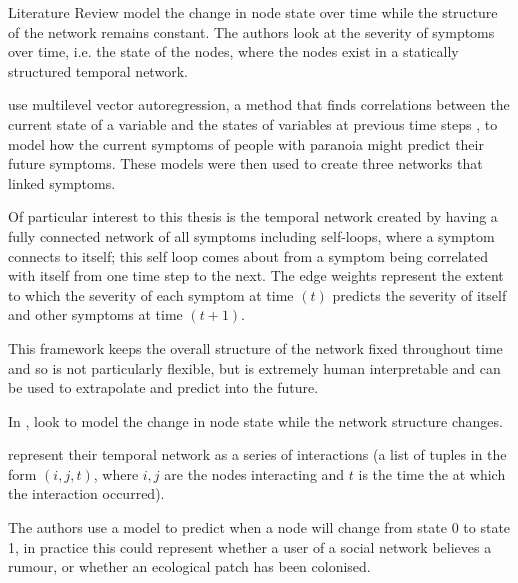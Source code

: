 \documentclass[12pt]{amsbook}
\begin{document}
\begin{chapter}{Literature Review}
        \cite{contreras2020temporal} model the change in node state over time while the structure of the network remains constant. The authors look at the severity of symptoms over time, i.e. the state of the nodes, where the nodes exist in a statically structured temporal network. 
        
         use multilevel vector autoregression, a method that finds correlations between the current state of a variable and the states of variables at previous time steps \cite{singer2003applied}, to model how the current symptoms of people with paranoia might predict their future symptoms. These models were then used to create three networks that linked symptoms. 
        
        Of particular interest to this thesis is the temporal network created by having a fully connected network of all symptoms including self-loops, where a symptom connects to itself; this self loop comes about from a symptom being correlated with itself from one time step to the next. The edge weights represent the extent to which the severity of each symptom at time $(t)$ predicts the severity of itself and other symptoms at time $(t+1)$. 
        
        This framework keeps the overall structure of the network fixed throughout time and so is not particularly flexible, but is extremely human interpretable and can be used to extrapolate and predict into the future. 

        In \cite{KARIMI20133476},  look to model the change in node state while the network structure changes. 
        
         represent their temporal network as a series of interactions (a list of tuples in the form $(i,j,t)$, where $i,j$ are the nodes interacting and $t$ is the time the at which the interaction occurred). 
        
        The authors use a model to predict when a node will change from state 0 to state 1, in practice this could represent whether a user of a social network believes a rumour, or whether an ecological patch has been colonised. 
        

\end{chapter}
\end{document}
